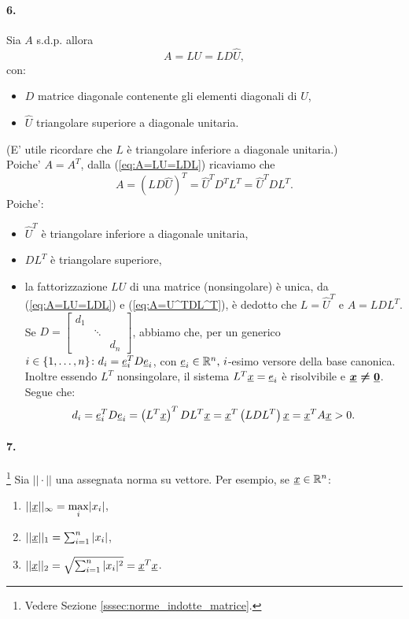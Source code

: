 \paragraph{6.} Sia $A$ s.d.p. allora
\begin{equation}\label{eq:A=LU=LDL}
	A = LU = L D \hat{U},
\end{equation}
con:
\begin{itemize}
	\item $D$ matrice diagonale contenente gli elementi diagonali di $U$,
	\item $\hat{U}$ triangolare superiore a diagonale unitaria.
\end{itemize}
(E' utile ricordare che $L$ è triangolare inferiore a diagonale unitaria.)\\
Poiche' $A=A^T$, dalla (\ref{eq:A=LU=LDL}) ricaviamo che
\begin{equation}\label{eq:A=U^TDL^T}
	A = (L D \hat{U})^T = \hat{U}^T D^T L^T = \hat{U}^T D L^T.
\end{equation}
Poiche':
\begin{itemize}
	\item $\hat{U}^T$ è triangolare inferiore a diagonale unitaria,
	\item $DL^T$ è triangolare superiore,
	\item la fattorizzazione $LU$ di una matrice (nonsingolare) è unica, da (\ref{eq:A=LU=LDL}) e (\ref{eq:A=U^TDL^T}), è dedotto che $L=\hat{U}^T$ e $A=LDL^T$.\\
	Se $D =
	\begin{bmatrix}
		d_1\\
		&\ddots\\
		& & d_n
	\end{bmatrix}$, abbiamo che, per un generico $i\in\{1,\hdots, n\}\colon d_i = \uline e_i^T D \uline e_i$, con $\uline e_i\in\mathbb{R}^n,\, i$-esimo versore della base canonica. Inoltre essendo $L^T$ nonsingolare, il sistema $L^T\uline x = \uline e_i$ è risolvibile e $\boldsymbol{\uline x\neq \uline 0}$. Segue che:
	\begin{equation*}
		d_i = \uline e_i^T D \uline e_i = \left(L^T\uline x\right)^T D L^T \uline x =\uline x^T \left(LDL^T\right) \uline x = \uline x^T A \uline x > 0.
	\end{equation*}
\end{itemize}


\paragraph{7.}\footnote{Vedere Sezione \ref{sssec:norme_indotte_matrice}.} Sia $||\cdot||$ una assegnata norma su vettore. Per esempio, se $\uline x\in\mathbb{R}^n$:
\begin{enumerate}
	\item $||\uline x||_\infty = \underset{i}{\max}|x_i|$,
	\item $||\uline x||_1 = \sum_{i=1}^{n}|x_i|$,
	\item $||\uline x||_2 = \sqrt{\sum_{i=1}^{n}|x_i|^2} = \uline x^T\uline x$.
\end{enumerate}

